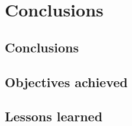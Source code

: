 \chapter{Conclusions}
\label{ch:conclusions}


\section{Conclusions}

\section{Objectives achieved}

\section{Lessons learned}
